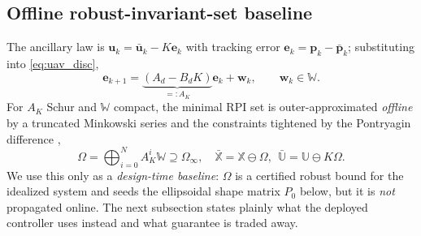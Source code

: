 \documentclass[letterpaper, 10 pt, conference]{ieeeconf}  %
\begin{document}
\subsection{Offline robust-invariant-set baseline}
\label{sec:mrpi}
The ancillary law is $\mathbf{u}_k=\bar{\mathbf{u}}_k-K\mathbf{e}_k$ with tracking
error $\mathbf{e}_k=\mathbf{p}_k-\bar{\mathbf{p}}_k$; substituting into
\eqref{eq:uav_disc},
\begin{equation}
\mathbf{e}_{k+1}=\underbrace{(A_d-B_dK)}_{=:A_K}\mathbf{e}_k+\mathbf{w}_k,
\qquad \mathbf{w}_k\in\mathbb{W}.
\label{eq:error_dynamics}
\end{equation}
For $A_K$ Schur and $\mathbb{W}$ compact, the minimal RPI set is outer-approximated \emph{offline}
by a truncated Minkowski series and the constraints tightened by the Pontryagin difference
\cite{mRPI},
\begin{equation}
\Omega=\textstyle\bigoplus_{i=0}^{N}A_K^i\mathbb{W}\supseteq\Omega_\infty,\quad
\bar{\mathbb{X}}=\mathbb{X}\ominus\Omega,\ \ \bar{\mathbb{U}}=\mathbb{U}\ominus K\Omega .
\label{eq:mrpi}
\end{equation}
We use this only as a \emph{design-time baseline}: $\Omega$ is a certified robust bound for the
idealized system and seeds the ellipsoidal shape matrix $P_0$ below, but it is \emph{not}
propagated online. The next subsection states plainly what the deployed controller uses instead
and what guarantee is traded away.
\end{document}
